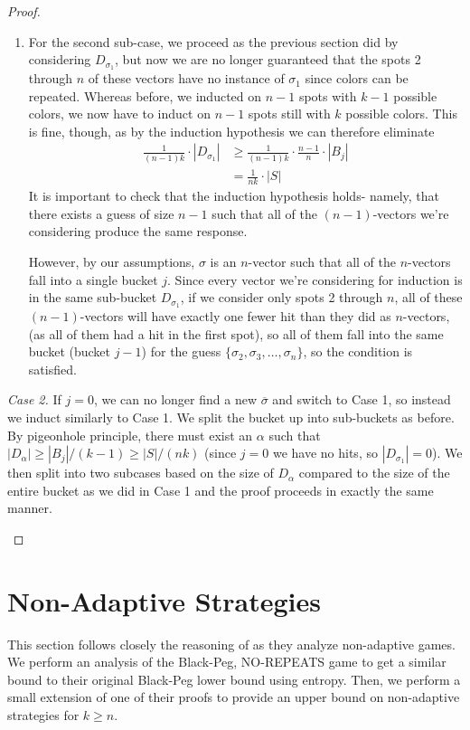 \documentclass[12pt, a4paper]{article}
\begin{document}
\begin{proof}
\begin{enumerate}
\begin{enumerate}[label=\roman*.]
		\item For the second sub-case, we proceed as the previous section did by
		considering $D_{\sigma_1}$, but now we are no longer guaranteed that the spots
		2 through $n$ of these vectors have no
		instance of $\sigma_1$
		since colors can be repeated. Whereas before, we inducted on $n-1$ spots with
		$k-1$ possible colors, we now have to induct on $n-1$ spots still with $k$
		possible colors. This is fine,
		though, as by the induction hypothesis we can therefore eliminate
			\begin{align*}
			\frac{1}{(n-1)k}\cdot|D_{\sigma_1}|
			& \ge \frac{1}{(n-1)k}\cdot\frac{n-1}{n}\cdot|B_j|\\
			& = \frac{1}{nk}\cdot|S|
			\end{align*}
		It is important to check that the induction hypothesis holds- namely, that
		there exists a guess of size $n-1$ such that all of the $(n-1)$-vectors
		we're considering produce the same response.
		
		However, by our assumptions, $\sigma$ is an $n$-vector such that all of the
		$n$-vectors fall into a  single bucket $j$. Since every vector we're
		considering for induction is in the same sub-bucket 
		$D_{\sigma_1}$, if we consider only spots 2 through $n$, all of these
		$(n-1)$-vectors will have exactly one fewer hit than they did as $n$-vectors,
		(as all of them had a hit in the first spot), so all of them fall into the
		same bucket (bucket $j-1$) for the guess
		$\{\sigma_2, \sigma_3, \ldots, \sigma_n\}$, so the condition is satisfied.
		\end{enumerate}

		\textit{Case 2.} If $j=0$, we can no longer find a new $\overline{\sigma}$
		and switch to Case 1, so instead we
		induct similarly to Case 1. We split the
		bucket up into sub-buckets as before. By pigeonhole principle, there must exist
		an $\alpha$ such that
		$|D_\alpha| \ge |B_j|/(k-1) \ge |S|/(nk)$ (since $j=0$ we have no hits, so
		$|D_{\sigma_1}| = 0$).  We then 
		split into two subcases based on the size of $D_\alpha$ compared to the size of
		the entire bucket as we did in Case 1 and the proof proceeds in exactly the
		same manner.
		\end{enumerate}
	\end{proof}
	
\section{Non-Adaptive Strategies}
This section follows closely the reasoning of \cite{DS13} as they analyze non-adaptive games. 
We perform an analysis of the Black-Peg, NO-REPEATS game to get a similar bound to their original
Black-Peg lower bound using entropy. Then, we perform a small extension of one of their proofs to 
provide an upper bound on non-adaptive strategies for $k \geq n$.
\end{document}
